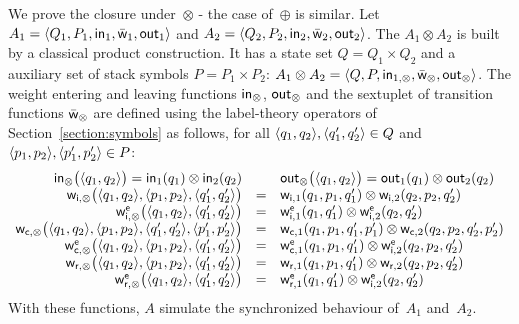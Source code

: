 %
%
We prove the closure under~$\otimes$
- the case of~$\oplus$ is similar.
% 
Let $A_1 = \< Q_1, P_1, \init_1, \bar\wei_1, \final_1 >$
and $A_2 = \< Q_2, P_2, \init_2, \bar\wei_2, \final_2 >$.
The \SWVPA $A_1 \otimes A_2$ is built by a 
classical product construction.
%
It has a state set $Q = Q_1 \times Q_2$
and a auxiliary set of stack symbols $P = P_1 \times P_2$:
$A_1 \otimes A_2 = \< Q, P, \init_{1, \otimes}, 
         \bar\wei_{\otimes}, \final_{\otimes} >$.
The weight entering and leaving functions         
$\mathsf{in}_{\otimes}$, $\mathsf{out}_{\otimes}$
and the sextuplet of transition functions $\bar{\mathsf{w}}_{\otimes}$
are defined 
using the label-theory operators of Section~\ref{section:symbols} as follows, 
%
for all $\< q_1, q_2>, \< q'_1, q'_2> \in Q$ 
and $\< p_1, p_2>, \< p'_1, p'_2> \in P$:
\[
\begin{array}{rcl}
\init_{\otimes}\bigl(\< q_1, q_2>\bigr) = \init_{1}(q_1) \otimes \init_{2}(q_2) & &
\final_{\otimes}\bigl(\< q_1, q_2>\bigr) = \final_{1}(q_1) \otimes \final_{2}(q_2)\\
%
\wei_{\mathsf{i}, \otimes}\bigl(\< q_1, q_2>, \<p_1, p_2>, \<q'_1, q'_2>\bigr) & = &
\wei_{\mathsf{i}, 1}(q_1, p_1, q'_1) \otimes \wei_{\mathsf{i}, 2}(q_2, p_2, q'_2)\\
%
\weie[\mathsf{i}, \otimes]\bigl(\< q_1, q_2>, \<q'_1, q'_2>\bigr) & = &
\weie[\mathsf{i}, 1](q_1, q'_1) \otimes \weie[\mathsf{i}, 2](q_2, q'_2)\\
%
\wei_{\mathsf{c}, \otimes}\bigl(\< q_1, q_2>, \<p_1, p_2>, \<q'_1, q'_2>, \<p'_1, p'_2>\bigr) & = &
\wei_{\mathsf{c}, 1}(q_1, p_1, q'_1, p'_1) \otimes \wei_{\mathsf{c}, 2}(q_2, p_2, q'_2, p'_2)\\
%
\weie[\mathsf{c}, \otimes]\bigl(\< q_1, q_2>, \<p_1, p_2>, \<q'_1, q'_2>\bigr) & = &
\weie[\mathsf{c}, 1](q_1, p_1, q'_1) \otimes \weie[\mathsf{i}, 2](q_2, p_2, q'_2)\\
%
\wei_{\mathsf{r}, \otimes}\bigl(\< q_1, q_2>, \<p_1, p_2>, \<q'_1, q'_2>\bigr) & = &
\wei_{\mathsf{r}, 1}(q_1, p_1, q'_1) \otimes \wei_{\mathsf{r}, 2}(q_2, p_2, q'_2)\\
%
\weie[\mathsf{r}, \otimes]\bigl(\< q_1, q_2>, \<q'_1, q'_2>\bigr) & = &
\weie[\mathsf{r}, 1](q_1, q'_1) \otimes \weie[\mathsf{i}, 2](q_2, q'_2)\\
\end{array}
\]
With these functions, $A$ simulate the synchronized behaviour of~$A_1$ and~$A_2$.

